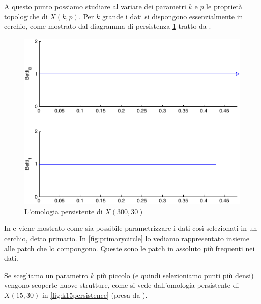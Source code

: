 A questo punto possiamo studiare al variare dei parametri $k$ e $p$ le proprietà topologiche di $X(k,p)$. Per $k$ grande i dati si dispongono essenzialmente in cerchio, come mostrato dal diagramma di persistenza \cref{fig:k300persistence} tratto da \cite{Carlsson2008}.

\begin{figure}[ht]
  \begin{center}
    \includegraphics[width=.8\linewidth]{gfx/image_patches_k300.pdf}
    \caption{L'omologia persistente di $X(300,30)$}
    \label{fig:k300persistence}
  \end{center}
\end{figure}

In \cite{Carlsson2008} e \cite{DeSilva2004} viene mostrato come sia possibile parametrizzare i dati così selezionati in un cerchio, detto primario. In \cref{fig:primarycircle} lo vediamo rappresentato insieme alle patch che lo compongono. Queste sono le patch in assoluto più frequenti nei dati.


Se scegliamo un parametro $k$ più piccolo (e quindi selezioniamo punti più densi) vengono scoperte nuove strutture, come si vede dall'omologia persistente di $X(15,30)$ in \cref{fig:k15persistence} (presa da \cite{Carlsson2008}).

